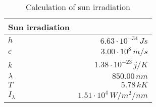 \begin{table}[H]
\centering
\caption{Calculation of sun irradiation}
\label{tab:sun_irradiation}
\begin{tabular}{|l|r|}\hline
    \textbf{Sun irradiation} & \\
    \hline 
    $h$ & $6.63\cdot10^{-34}\,Js$ \\
    $c$ & $3.00\cdot10^{8}\,m/s$ \\
    $k$ & $1.38\cdot10^{-23}\,j/K$ \\
    $\lambda$ & $850.00\,n m$ \\
    $T$ & $5.78\,k K$ \\
    $I_\lambda$ & $1.51\cdot10^{4}\,W/m^2/nm$ \\
    \hline 
\end{tabular}
\end{table}
